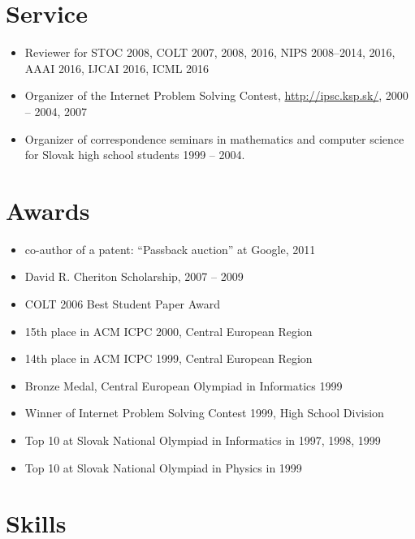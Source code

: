 \documentclass[10pt]{article}
\begin{document}
\section*{Service}

\begin{itemize}
\item Reviewer for STOC 2008, COLT 2007, 2008, 2016, NIPS 2008--2014, 2016, AAAI 2016, IJCAI 2016, ICML 2016
\item Organizer of the Internet Problem Solving Contest, \url{http://ipsc.ksp.sk/}, 2000 -- 2004, 2007
\item Organizer of correspondence seminars in mathematics and computer science for Slovak high school students 1999 -- 2004.
\end{itemize}

\section*{Awards}

\begin{itemize}
\item co-author of a patent: ``Passback auction'' at Google, 2011
\item David R. Cheriton Scholarship, 2007 -- 2009
\item COLT 2006 Best Student Paper Award
\item 15th place in ACM ICPC 2000, Central European Region
\item 14th place in ACM ICPC 1999, Central European Region
\item Bronze Medal, Central European Olympiad in Informatics 1999
\item Winner of Internet Problem Solving Contest 1999, High School Division
\item Top 10 at Slovak National Olympiad in Informatics in 1997, 1998, 1999
\item Top 10 at Slovak National Olympiad in Physics in 1999
\end{itemize}

\renewcommand{\refname}{Publications}
\nocite{*}



\section*{Skills}
\end{document}
